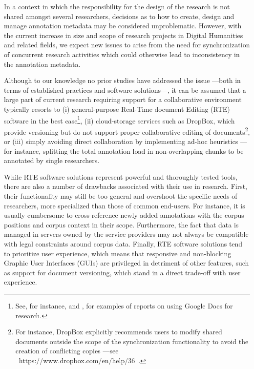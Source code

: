 \documentclass{sig-alternate}
\begin{document}
In a context in which the responsibility for the design of the research is not shared
amongst several researchers, decisions as to how to create, design and manage annotation
metadata may be considered unproblematic. However, with the current increase in size and scope of
research projects in Digital Humanities and related fields, we expect new issues to arise from
the need for synchronization of concurrent research activities which could otherwise lead to
inconsistency in the annotation metadata.

Although to our knowledge no prior studies have addressed the issue ---both in terms of
established practices and software solutions---,
it can be assumed that a large part of current research requiring support for a
collaborative environment typically resorts to (i) general-purpose Real-Time document Editing
(RTE) software in the best case\footnote{
  See, for instance, \cite{Rowlands2011} and \cite{Wood2011}, for examples of reports on
  using Google Docs for research.
}, (ii) cloud-storage services such as DropBox, which provide versioning but do
not support proper collaborative editing of documents\footnote{
  For instance, DropBox explicitly recommends users to modify shared documents outside the scope
  of the synchronization functionality to avoid the creation of conflicting copies ---see
  ~https://www.dropbox.com/en/help/36~.
}, or (iii) simply avoiding direct collaboration by implementing ad-hoc heuristics ---for
instance, splitting the total annotation load in non-overlapping chunks to be annotated by
single researchers.

While RTE software solutions represent powerful and thoroughly tested tools, there are also
a number of drawbacks associated with their use in research.
First, their functionality may still be too general and overshoot the specific needs of
researchers, more specialized than those of common end-users. For instance, it is usually
cumbersome to cross-reference newly added annotations with the corpus positions and corpus
context in their scope.
Furthermore, the fact that data is managed in servers owned by the service providers may not
always be compatible with legal constraints around corpus data.
Finally, RTE software solutions tend to prioritize user experience, which means that
responsive and non-blocking Graphic User Interfaces (GUIs) are privileged in detriment of
other features, such as support for document versioning, which stand in a direct trade-off
with user experience.
\end{document}
